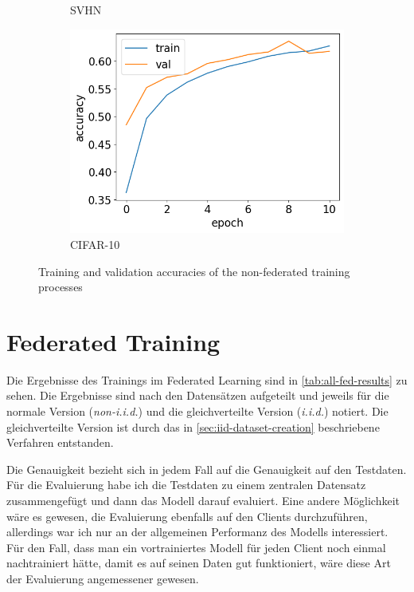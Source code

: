 \begin{figure}
\begin{subfigure}{0.32\textwidth}
		\caption{SVHN}
	\end{subfigure}
	\begin{subfigure}{0.32\textwidth}
		\centering
		\includegraphics[width=\textwidth]{Bilder/cifar-results-local.png}
		\caption{CIFAR-10}
	\end{subfigure}
	\caption{Training and validation accuracies of the non-federated training processes}
	\label{fig:local-training-histories}
\end{figure}

\section{Federated Training}\label{sec:fl-training-results}

Die Ergebnisse des Trainings im Federated Learning sind in \autoref{tab:all-fed-results} zu sehen. Die Ergebnisse sind nach den Datensätzen aufgeteilt und jeweils für die normale Version (\textit{non-i.i.d.}) und die gleichverteilte Version (\textit{i.i.d.}) notiert. Die gleichverteilte Version ist durch das in \autoref{sec:iid-dataset-creation} beschriebene Verfahren entstanden.

Die Genauigkeit bezieht sich in jedem Fall auf die Genauigkeit auf den Testdaten. Für die Evaluierung habe ich die Testdaten zu einem zentralen Datensatz zusammengefügt und dann das Modell darauf evaluiert. Eine andere Möglichkeit wäre es gewesen, die Evaluierung ebenfalls auf den Clients durchzuführen, allerdings war ich nur an der allgemeinen Performanz des Modells interessiert. Für den Fall, dass man ein vortrainiertes Modell für jeden Client noch einmal nachtrainiert hätte, damit es auf seinen Daten gut funktioniert, wäre diese Art der Evaluierung angemessener gewesen.

